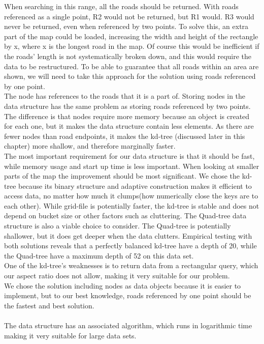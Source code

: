 \documentclass[a4paper,10pt,titlepage]{article}
\begin{document}
 When searching in this range, all the roads should be returned. With roads referenced as a single point, R2 would not be returned, but R1 would. R3 would never be returned, even when referenced by two points. To solve this, an extra part of the map could be loaded, increasing the width and height of the rectangle by x, where x is the longest road in the map. Of course this would be inefficient if the roads' length is not systematically broken down, and this would require the data to be restructured. To be able to guarantee that all roads within an area are shown, we will need to take this approach for the solution using roads referenced by one point.\\
The node has references to the roads that it is a part of. Storing nodes in the data structure has the same problem as storing roads referenced by two points. The difference is that nodes require more memory because an object is created for each one, but it makes the data structure contain less elements. As there are fewer nodes than road endpoints, it makes the kd-tree (discussed later in this chapter) more shallow, and therefore marginally faster.\\
The most important requirement for our data structure is that it should be fast, while memory usage and start up time is less important. When looking at smaller parts of the map the improvement should be most significant. We chose the kd-tree because its binary structure and adaptive construction makes it efficient to access data, no matter how much it clumps(how numerically close the keys are to each other). While grid-file is potentially faster, the kd-tree is stable and does not depend on bucket size or other factors such as cluttering.  The Quad-tree data structure is also a viable choice to consider. The Quad-tree is potentially shallower, but it does get deeper when the data clutters. Empirical testing with both solutions reveals that a perfectly balanced kd-tree have a depth of 20, while the Quad-tree have a maximum depth of 52 on this data set.\\One of the kd-tree’s weaknesses is to return data from a rectangular query, which our aspect ratio does not allow, making it very suitable for our problem.\\We chose the solution including nodes as data objects because it is easier to implement, but to our best knowledge, roads referenced by one point should be the fastest and best solution.\\
\\
The data structure has an associated algorithm, which runs in logarithmic time making it very suitable for large data sets.\\
\end{document}
